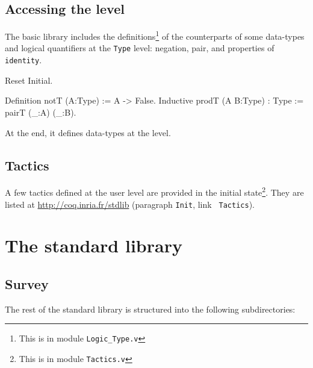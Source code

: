 \subsection{Accessing the {\Type} level}

The basic library includes the definitions\footnote{This is in module
{\tt Logic\_Type.v}} of the counterparts of some data-types and logical
quantifiers at the \verb:Type: level: negation, pair, and properties
of {\tt identity}.

\begin{coq_eval}
Reset Initial.
\end{coq_eval}
\begin{coq_example*}
Definition notT (A:Type) := A -> False.
Inductive prodT (A B:Type) : Type := pairT (_:A) (_:B).
\end{coq_example*}

At the end, it defines data-types at the {\Type} level.

\subsection{Tactics}

A few tactics defined at the user level are provided in the initial
state\footnote{This is in module {\tt Tactics.v}}. They are listed at
\url{http://coq.inria.fr/stdlib} (paragraph {\tt Init}, link {\tt
  Tactics}).

\section{The standard library}

\subsection{Survey}

The rest of the standard library is structured into the following
subdirectories:

